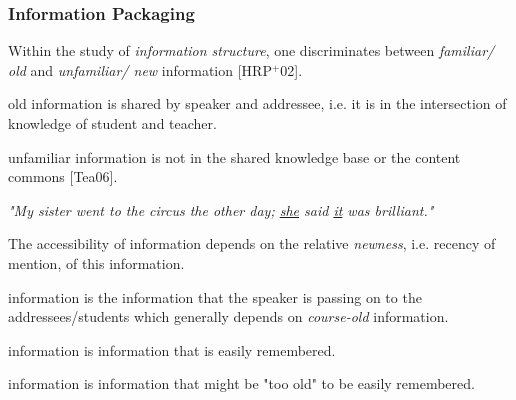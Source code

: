 \begin{frame}
  \frametitle{Information Packaging}
  \begin{module}[id=infoPackaging]

    Within the study of \textit{information structure}, one discriminates between \textit{familiar/ old} and \textit{unfamiliar/ new} information [HRP$^+$02].\\

    \begin{definition}  {old} {information} is shared by speaker and addressee, i.e. it is in the intersection of knowledge of student and teacher.\end{definition}
    \begin{definition}  {unfamiliar} {information} is not in the shared knowledge base or the content commons [Tea06]. \end{definition}

  \begin{center}
  \textit{"My sister went to the circus the other day; \underline{she} said \underline{it} was brilliant."}\\
  \end{center}
\noindent
 The accessibility of information depends on the relative \textit{newness}, i.e. recency of mention, of this information.\\

    \begin{definition}  {information} is the information that the speaker is passing on to the addressees/students which generally depends on \textit{course-old} information. \end{definition}
    \begin{definition}  {information} is information that is easily remembered. \end{definition}
    \begin{definition}  {information} is information that might be "too old" to be easily remembered. \end{definition}

  \end{module}
\end{frame}
